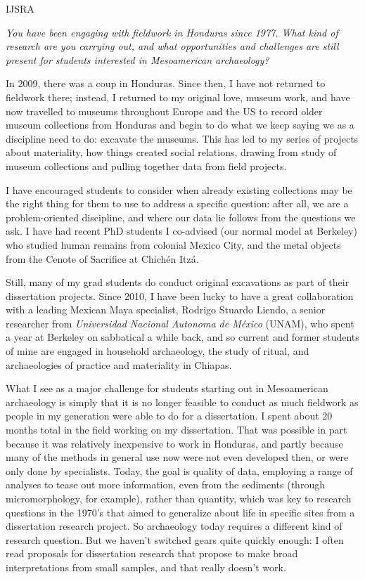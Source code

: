 \begin{labeling}{IJSRA}
\item[IJSRA] \textit{You have been engaging with fieldwork in Honduras since 1977. What kind of research are you carrying out, and what opportunities and challenges are still present for students interested in Mesoamerican archaeology?}

\item[RAJ] In 2009, there was a coup in Honduras. Since then, I have not returned to fieldwork there; instead, I returned to my original love, museum work, and have now travelled to museums throughout Europe and the US to record older museum collections from Honduras and begin to do what we keep saying we as a discipline need to do: excavate the museums. This has led to my series of projects about materiality, how things created social relations, drawing from study of museum collections and pulling together data from field projects.

  I have encouraged students to consider when already existing collections may be the right thing for them to use to address a specific question: after all, we are a problem-oriented discipline, and where our data lie follows from the questions we ask. I have had recent PhD students I co-advised (our normal model at Berkeley) who studied human remains from colonial Mexico City, and the metal objects from the Cenote of Sacrifice at Chichén Itzá.
  
  Still, many of my grad students do conduct original excavations as part of their dissertation projects. Since 2010, I have been lucky to have a great collaboration with a leading Mexican Maya specialist, Rodrigo Stuardo Liendo, a senior researcher from \textit{Universidad Nacional Autonoma de México} (UNAM), who spent a year at Berkeley on sabbatical a while back, and so current and former students of mine are engaged in household archaeology, the study of ritual, and archaeologies of practice and materiality in Chiapas.
  
 What I see as a major challenge for students starting out in Mesoamerican archaeology is simply that it is no longer feasible to conduct as much fieldwork as people in my generation were able to do for a dissertation. I spent about 20 months total in the field working on my dissertation. That was possible in part because it was relatively inexpensive to work in Honduras, and partly because many of the methods in general use now were not even developed then, or were only done by specialists. Today, the goal is quality of data, employing a range of analyses to tease out more information, even from the sediments (through micromorphology, for example), rather than quantity, which was key to research questions in the 1970's that aimed to generalize about life in specific sites from a dissertation research project. So archaeology today requires a different kind of research question. But we haven't switched gears quite quickly enough: I often read proposals for dissertation research that propose to make broad interpretations from small samples, and that really doesn't work.


\end{labeling}
